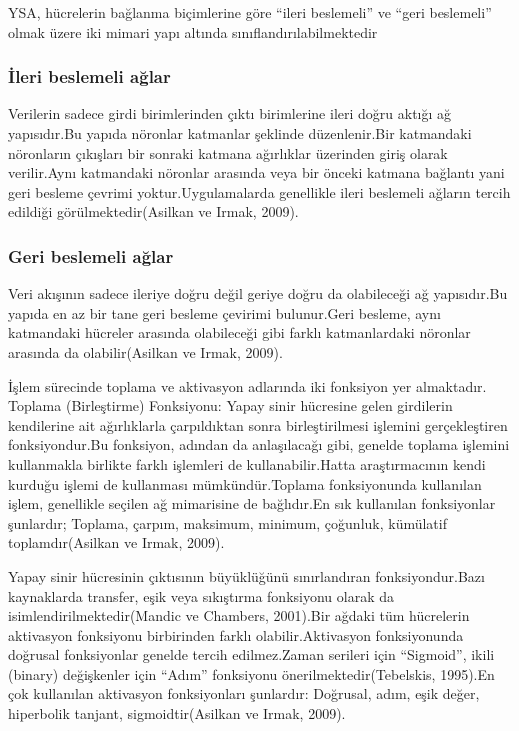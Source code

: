 \documentclass[12pt,twoside]{deuthesis}
\begin{document}
YSA, hücrelerin bağlanma biçimlerine göre ``ileri beslemeli'' ve ``geri beslemeli'' olmak üzere iki mimari yapı altında sınıflandırılabilmektedir

\hypertarget{ileri-beslemeli-aux11flar}{%
\subsubsection{İleri beslemeli ağlar}\label{ileri-beslemeli-aux11flar}}

Verilerin sadece girdi birimlerinden çıktı birimlerine ileri doğru aktığı ağ yapısıdır.Bu yapıda nöronlar katmanlar şeklinde düzenlenir.Bir katmandaki nöronların çıkışları bir sonraki katmana ağırlıklar üzerinden giriş olarak verilir.Aynı katmandaki nöronlar arasında veya bir önceki katmana bağlantı yani geri besleme çevrimi yoktur.Uygulamalarda genellikle ileri beslemeli ağların tercih edildiği görülmektedir(Asilkan ve Irmak, 2009).

\hypertarget{geri-beslemeli-aux11flar}{%
\subsubsection{Geri beslemeli ağlar}\label{geri-beslemeli-aux11flar}}

Veri akışının sadece ileriye doğru değil geriye doğru da olabileceği ağ yapısıdır.Bu yapıda en az bir tane geri besleme çevirimi bulunur.Geri besleme, aynı katmandaki hücreler arasında olabileceği gibi farklı katmanlardaki nöronlar arasında da olabilir(Asilkan ve Irmak, 2009).

İşlem sürecinde toplama ve aktivasyon adlarında iki fonksiyon yer almaktadır.
Toplama (Birleştirme) Fonksiyonu: Yapay sinir hücresine gelen girdilerin kendilerine ait ağırlıklarla çarpıldıktan sonra birleştirilmesi işlemini gerçekleştiren fonksiyondur.Bu fonksiyon, adından da anlaşılacağı gibi, genelde toplama işlemini kullanmakla birlikte farklı işlemleri de kullanabilir.Hatta araştırmacının kendi kurduğu işlemi de kullanması mümkündür.Toplama fonksiyonunda kullanılan işlem, genellikle seçilen ağ mimarisine de bağlıdır.En sık kullanılan fonksiyonlar şunlardır; Toplama, çarpım, maksimum, minimum, çoğunluk, kümülatif toplamdır(Asilkan ve Irmak, 2009).

Yapay sinir hücresinin çıktısının büyüklüğünü sınırlandıran fonksiyondur.Bazı kaynaklarda transfer, eşik veya sıkıştırma fonksiyonu olarak da isimlendirilmektedir(Mandic ve Chambers, 2001).Bir ağdaki tüm hücrelerin aktivasyon fonksiyonu birbirinden farklı olabilir.Aktivasyon fonksiyonunda doğrusal fonksiyonlar genelde tercih edilmez.Zaman serileri için ``Sigmoid'', ikili (binary) değişkenler için ``Adım'' fonksiyonu önerilmektedir(Tebelskis, 1995).En çok kullanılan aktivasyon fonksiyonları şunlardır: Doğrusal, adım, eşik değer, hiperbolik tanjant, sigmoidtir(Asilkan ve Irmak, 2009).
\end{document}
